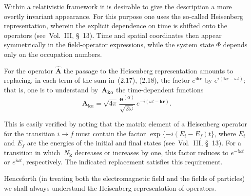 Within a relativistic framework it is desirable to give the description a more overtly invariant appearance. For this purpose one uses the so-called Heisenberg representation, wherein the explicit dependence on time is shifted onto the operators (see~Vol.~III, \S~13). Time and spatial coordinates then appear symmetrically in the field-operator expressions, while the system state $\Phi$ depends only on the occupation numbers.

For the operator $\hat{\mathbf{A}}$ the passage to the Heisenberg representation amounts to replacing, in each term of the sum in~(2.17), (2.18), the factor $e^{i\mathbf{kr}}$ by $e^{i(\mathbf{kr}-\omega t)}$; that is, one is to understand by~$\mathbf{A}_{\mathbf{k}\alpha}$ the time-dependent functions
\begin{equation}
\mathbf{A}_{\mathbf{k}\alpha} = \sqrt{4\pi}\,\frac{\mathbf{e}^{(\alpha)}}{\sqrt{2\omega}}\, e^{-i(\omega t - \mathbf{kr})}.
\tag{2.26}
\end{equation}

This is easily verified by noting that the matrix element of a Heisenberg operator for the transition $i \to f$ must contain the factor $\exp\{-i(E_i - E_f)t\}$, where $E_i$ and $E_f$ are the energies of the initial and final states (see~Vol.~III, \S~13). For a transition in which~$N_{\mathbf{k}}$ decreases or increases by one, this factor reduces to $e^{-i\omega t}$ or $e^{i\omega t}$, respectively. The indicated replacement satisfies this requirement.

Henceforth (in treating both the electromagnetic field and the fields of particles) we shall always understand the Heisenberg representation of operators.
